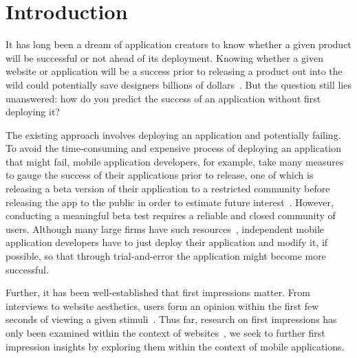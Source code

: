 \section{Introduction}



It has long been a dream of application creators to know whether a given product will be successful or not ahead of its deployment. Knowing whether a given website or application will be a success prior to releasing a product out into the wild could potentially save designers billions of dollars~\cite{needsource}. But the question still lies unanswered: how do you predict the success of an application without first deploying it?

The existing approach involves deploying an application and potentially failing. To avoid the time-consuming and expensive process of deploying an application that might fail, mobile application developers, for example, take many measures to gauge the success of their applications prior to release, one of which is releasing a beta version of their application to a restricted community before releasing the app to the public in order to estimate future interest~\cite{needsource}. However, conducting a meaningful beta test requires a reliable and closed community of users. Although many large firms have such resources~\cite{needsource}, independent mobile application developers have to just deploy their application and modify it, if possible, so that through trial-and-error the application might become more successful.

Further, it has been well-established that first impressions matter. From interviews to website aesthetics, users form an opinion within the first few seconds of viewing a given stimuli~\cite{needsource}. Thus far, research on first impressions has only been examined within the context of websites~\cite{needsource}, we seek to further first impression insights by exploring them within the context of mobile applications.

